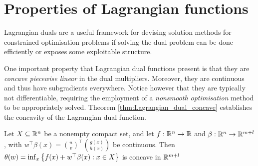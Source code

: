 %


\section{Properties of Lagrangian functions}


Lagrangian duals are a useful framework for devising solution methods for constrained optimisation problems if solving the dual problem can be done efficiently or exposes some exploitable structure.

One important property that Lagrangian dual functions present is that they are \emph{concave piecewise linear} in the dual multipliers. Moreover, they are continuous and thus have subgradients everywhere. Notice however that they are typically not differentiable, requiring the employment of a \emph{nonsmooth optimisation} method to be appropriately solved. Theorem \ref{thm:Lagrangian_dual_concave} establishes the concavity of the Lagrangian dual function.

\begin{theorem}\label{thm:Lagrangian_dual_concave}
Let $X \subseteq \mathbb{R}^n$ be a nonempty compact set, and let $f: \mathbb{R}^n \rightarrow \mathbb{R}$ and $\beta : \mathbb{R}^{n} \rightarrow \mathbb{R}^{m+l}$, with $w^\top\beta(x) = \binom{u}{v}^\top \binom{g(x)}{h(x)}$ be continuous. Then $\theta(w) = \inf_x\left\{ f(x) + w^\top\beta(x) : x \in X \right \}$ is concave in $\mathbb{R}^{m+l}$
\end{theorem}

